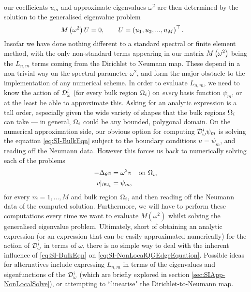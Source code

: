 our coefficients $u_m$ and approximate eigenvalues $\omega^2$ are then determined by the solution to the generalised eigenvalue problem
\begin{align*}
	M\left( \omega^2 \right)U &= 0,
	\qquad
	U = \left( u_1, u_2, ... , u_M \right)^{\top}.
\end{align*}
Insofar we have done nothing different to a standard spectral or finite element method, with the only non-standard terms appearing in our matrix $M\left( \omega^2 \right)$ being the $L_{n,m}$ terms coming from the Dirichlet to Neumann map.
These depend in a non-trivial way on the spectral parameter $\omega^2$, and form the major obstacle to the implementation of any numerical scheme.
In order to evaluate $L_{n,m}$, we need to know the action of $\mathcal{D}_{\omega}^i$ (for every bulk region $\Omega_i$) on \emph{every} basis function $\psi_m$, or at the least be able to approximate this.
Asking for an analytic expression is a tall order, especially given the wide variety of shapes that the bulk regions $\Omega_i$ can take --- in general, $\Omega_i$ could be any bounded, polygonal domain.
On the numerical approximation side, our obvious option for computing $\mathcal{D}^i_\omega\psi_m$ is solving the equation \eqref{eq:SI-BulkEqn} subject to the boundary conditions $u=\psi_m$, and reading off the Neumann data.
However this forces us back to numerically solving each of the problems
\begin{align*}
	-\Delta_{\theta}v &= \omega^2 v &\text{on } \Omega_i, \\
	v\vert_{\partial\Omega_i} &= \psi_m,
\end{align*}
for every $m=1,...,M$ and bulk region $\Omega_i$, and then reading off the Neumann data of the computed solution.
Furthermore, we will have to perform these computations every time we want to evaluate $M(\omega^2)$ whilst solving the generalised eigenvalue problem.
Ultimately, short of obtaining an analytic expression (or an expression that can be easily approximated numerically) for the action of $\mathcal{D}^i_{\omega}$ in terms of $\omega$, there is no simple way to deal with
the inherent influence of \eqref{eq:SI-BulkEqn} on \eqref{eq:SI-NonLocalQGEdgeEquation}.
Possible ideas for alternatives include expressing $L_{n,m}$ in terms of the eigenvalues and eigenfunctions of the $\mathcal{D}^i_\omega$ (which are briefly explored in section \ref{sec:SIApp-NonLocalSolve}), or attempting to ``linearise" the Dirichlet-to-Neumann map.